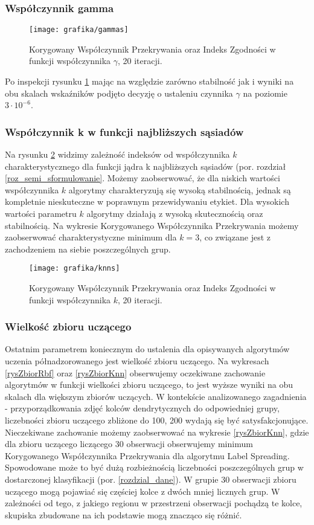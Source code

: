 \documentclass{article}
\begin{document}
\subsubsection{Współczynnik gamma}
\begin{figure}
\texttt{[image: grafika/gammas]}
\caption{Korygowany Współczynnik Przekrywania oraz Indeks Zgodności w funkcji współczynnika $\gamma$, 20 iteracji.}
\label{rysGammas}
\end{figure}

Po inspekcji rysunku \ref{rysGammas} mając na względzie zarówno stabilność jak i wyniki na obu skalach wskaźników podjęto decyzję o ustaleniu czynnika $\gamma$ na poziomie $3 \cdot 10^{-6}$.
\subsubsection{Współczynnik k w funkcji najbliższych sąsiadów}
Na rysunku \ref{rysKnns} widzimy zależność indeksów od współczynnika $k$ charakterystycznego dla funkcji jądra k najbliższych sąsiadów (por. rozdział \ref{roz_semi_sformulowanie}.
Możemy zaobserwować, że dla niskich wartości współczynnika $k$ algorytmy charakteryzują się wysoką stabilnością, jednak są kompletnie nieskuteczne w poprawnym przewidywaniu etykiet.
Dla wysokich wartości parametru $k$ algorytmy działają z wysoką skutecznością oraz stabilnością.
Na wykresie Korygowanego Współczynnika Przekrywania możemy zaobserwować charakterystyczne minimum dla $ k = 3 $, co związane jest z zachodzeniem na siebie poszczególnych grup.
\begin{figure}
\texttt{[image: grafika/knns]}
\caption{Korygowany Współczynnik Przekrywania oraz Indeks Zgodności w funkcji współczynnika $k$, 20 iteracji.}
\label{rysKnns}

\end{figure}
\FloatBarrier
\subsubsection{Wielkość zbioru uczącego}

Ostatnim parametrem koniecznym do ustalenia dla opisywanych algorytmów uczenia półnadzorowanego jest wielkość zbioru uczącego.
Na wykresach \ref{rysZbiorRbf} oraz \ref{rysZbiorKnn} obserwujemy oczekiwane zachowanie algorytmów w funkcji wielkości zbioru uczącego, to jest wyższe wyniki na obu skalach dla większym zbiorów uczących.
W kontekście analizowanego zagadnienia - przyporządkowania zdjęć kolców dendrytycznych do odpowiedniej grupy, liczebności zbioru uczącego zbliżone do 100, 200 wydają się być satysfakcjonujące.
Nieczekiwane zachowanie możemy zaobserwować na wykresie \ref{rysZbiorKnn}, gdzie dla zbioru uczącego liczącego 30 obserwacji obserwujemy minimum Korygowanego Współczynnika Przekrywania dla algorytmu Label Spreading.
Spowodowane może to być dużą rozbieżnością liczebności poszczególnych grup w dostarczonej klasyfikacji (por. \ref{rozdzial_dane}).
W grupie 30 obserwacji zbioru uczącego mogą pojawiać się częściej kolce z dwóch mniej licznych grup.
W zależności od tego, z jakiego regionu w przestrzeni obserwacji pochądzą te kolce, skupiska zbudowane na ich podstawie mogą znacząco się różnić.
\end{document}
